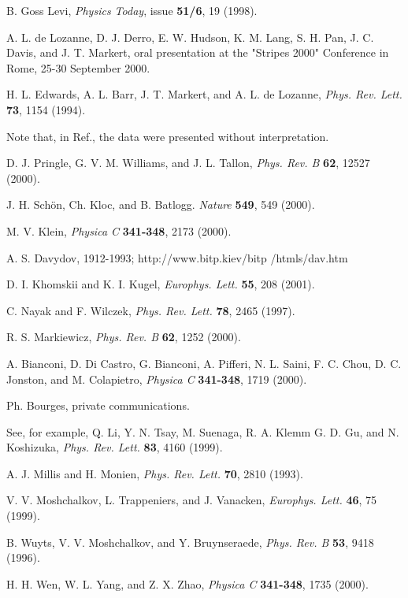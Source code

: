 \begin{references}
 B. Goss Levi, {\it Physics Today}, issue {\bf 51/6}, 19
(1998).

 A. L. de Lozanne, D. J. Derro, E. W. Hudson, K. M. Lang,
S. H. Pan, J. C. Davis, and J. T. Markert, oral presentation at the
"Stripes 2000" Conference in Rome, 25-30 September 2000.

 H. L. Edwards, A. L. Barr, J. T. Markert, and 
A. L. de Lozanne, {\it Phys. Rev. Lett.} {\bf 73}, 1154 (1994).

 Note that, in Ref.\cite{deLozanne}, the data were 
presented without interpretation. 

 D. J. Pringle, G. V. M. Williams, and J. L. Tallon,
{\it Phys. Rev. B} {\bf 62}, 12527 (2000).

 J. H. Sch\"{o}n, Ch. Kloc, and B. Batlogg. {\it Nature} 
{\bf 549}, 549 (2000).

 M. V. Klein, {\it Physica C} {\bf 341-348}, 2173 (2000).

 A. S. Davydov, 1912-1993; 
http://www.bitp.kiev/bitp /htmls/dav.htm

 D. I. Khomskii and K. I. Kugel, {\it Europhys. Lett.} 
{\bf 55}, 208 (2001). 

 C. Nayak and F. Wilczek, {\it Phys. Rev. Lett.} {\bf 78},
2465 (1997).

 R. S. Markiewicz, {\it Phys. Rev. B} {\bf 62}, 1252 (2000).

 A. Bianconi, D. Di Castro, G. Bianconi, 
A. Pifferi, N. L. Saini, F. C. Chou, D. C. Jonston, and M. Colapietro, 
{\it Physica C} {\bf 341-348}, 1719 (2000).

 Ph. Bourges, private communications.

 See, for example, Q. Li, Y. N. Tsay, M. Suenaga, R. A. Klemm
G. D. Gu, and N. Koshizuka, {\it Phys. Rev. Lett.} {\bf 83}, 4160 (1999).

 A. J. Millis and H. Monien, {\it Phys. Rev. Lett.} 
{\bf 70},  2810 (1993).

 V. V. Moshchalkov, L. Trappeniers, and J. Vanacken,
{\it Europhys. Lett.} {\bf 46}, 75 (1999).

 B. Wuyts, V. V. Moshchalkov, and Y. Bruynseraede, 
{\it Phys. Rev. B} {\bf 53}, 9418 (1996).

 H. H. Wen, W. L. Yang, and Z. X. Zhao, {\it Physica C} 
{\bf 341-348}, 1735 (2000).


\end{references}
